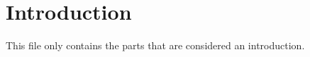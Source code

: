 \documentclass[subfiles-np.tex]{subfiles}
\begin{document}
\section{Introduction}

This file only contains the parts that are considered an introduction. 
\end{document}
